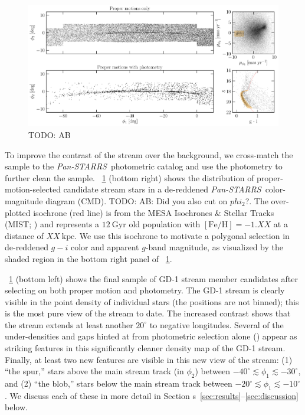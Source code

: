 \documentclass[modern]{aastex62}
\newcommand{\pans}{\textsl{Pan-STARRS}}
\newcommand{\kpc}{\textrm{kpc}}
\newcommand{\feh}{\ensuremath{[\textrm{Fe} / \textrm{H}]}}
\newcommand{\sectionname}{Section}
\newcommand{\todo}[1]{{\color{red} TODO: #1}}
\begin{document}
\begin{figure}[h]
\begin{center}
\includegraphics[width=\textwidth]{gd1_sample.pdf}
\end{center}
\caption{
    \todo{AB}
\label{fig:selection}
}
\end{figure}

To improve the contrast of the stream over the background, we cross-match the
sample to the \pans\ photometric catalog and use the photometry to further clean
the sample.
\figurename~\ref{fig:selection} (bottom right) shows the distribution of
proper-motion-selected candidate stream stars in a de-reddened \pans\
color-magnitude diagram (CMD).
\todo{AB: Did you also cut on $phi_2$?}.
The over-plotted isochrone (red line) is from the MESA Isochrones \& Stellar
Tracks (MIST; \citealt{Dotter:2016, Choi:2016, Paxton:2011}) and represents a
$12~\textrm{Gyr}$ old population with $\feh = -1.XX$ at a distance of $XX~\kpc$.
We use this isochrone to motivate a polygonal selection in de-reddened $g-i$
color and apparent $g$-band magnitude, as visualized by the shaded region in the
bottom right panel of \figurename~\ref{fig:selection}.

\figurename~\ref{fig:selection} (bottom left) shows the final sample of GD-1
stream member candidates after selecting on both proper motion and photometry.
The GD-1 stream is clearly visible in the point density of individual stars (the
positions are not binned); this is the most pure view of the stream to date.
The increased contrast shows that the stream extends at least another $20^\circ$
to negative longitudes.
Several of the under-densities and gaps hinted at from photometric selection
alone (\citealt{Koposov:2010, Carlberg:2013}) appear as striking features in
this significantly cleaner density map of the GD-1 stream.
Finally, at least two new features are visible in this new view of the stream:
(1) ``the spur,'' stars above the main stream track (in $\phi_2$) between
$-40^\circ \lesssim \phi_1 \lesssim -30^\circ$, and (2) ``the blob,'' stars
below the main stream track between $-20^\circ \lesssim \phi_1 \lesssim
-10^\circ$.
We discuss each of these in more detail in \sectionname
s~\ref{sec:results}--\ref{sec:discussion} below.
\end{document}
